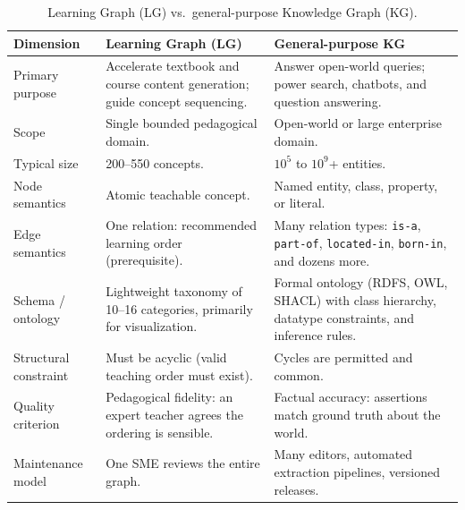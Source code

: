 \begin{table}[htbp]
\centering
\small
\caption{Learning Graph (LG) vs.\ general-purpose Knowledge Graph (KG).}
\label{tab:lg-vs-kg}
\renewcommand{\arraystretch}{1.15}
\begin{tabular}{p{}p{}p{}}
\toprule
\textbf{Dimension} & \textbf{Learning Graph (LG)} & \textbf{General-purpose KG} \\
\midrule
Primary purpose & Accelerate textbook and course content generation;
                  guide concept sequencing. &
                  Answer open-world queries; power search, chatbots, and
                  question answering. \\
Scope           & Single bounded pedagogical domain. &
                  Open-world or large enterprise domain. \\
Typical size    & 200--550 concepts. &
                  $10^5$ to $10^9$+ entities. \\
Node semantics  & Atomic teachable concept. &
                  Named entity, class, property, or literal. \\
Edge semantics  & One relation: recommended learning order (prerequisite). &
                  Many relation types: \texttt{is-a}, \texttt{part-of},
                  \texttt{located-in}, \texttt{born-in}, and dozens more. \\
Schema / ontology & Lightweight taxonomy of 10--16 categories, primarily
                    for visualization. &
                    Formal ontology (RDFS, OWL, SHACL) with class hierarchy,
                    datatype constraints, and inference rules. \\
Structural constraint & Must be acyclic (valid teaching order must exist). &
                        Cycles are permitted and common. \\
Quality criterion & Pedagogical fidelity: an expert teacher agrees the
                    ordering is sensible. &
                    Factual accuracy: assertions match ground truth about
                    the world. \\
Maintenance model & One SME reviews the entire graph. &
                    Many editors, automated extraction pipelines, versioned
                    releases. \\
\bottomrule
\end{tabular}
\end{table}

